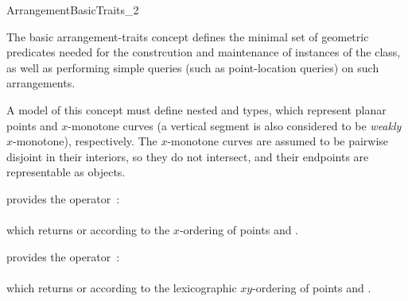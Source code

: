 
\ccRefPageBegin

\begin{ccRefConcept}{ArrangementBasicTraits_2}

\ccDefinition

The basic arrangement-traits concept defines the minimal set of geometric
predicates needed for the constrcution and maintenance of instances of the
 class, as well as performing simple queries (such as
point-location queries) on such arrangements.

A model of this concept must define nested  and
 types, which represent planar points and
$x$-monotone curves (a vertical segment is also considered to be
{\sl weakly} $x$-monotone), respectively. The $x$-monotone curves are assumed
to be pairwise disjoint in their interiors, so they do not intersect, and
their endpoints are representable as  objects.

\ccTypes






\ccThreeToTwo

{provides the operator~: \\
  \\
 which returns  or  according to the
 $x$-ordering of points  and .}

{provides the operator~: \\
  \\
 which returns  or  according to the
 lexicographic $xy$-ordering of points  and .}


\end{ccRefConcept}
